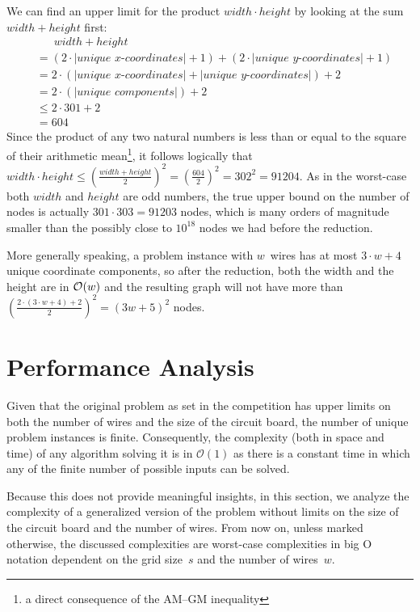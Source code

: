 \documentclass[sigconf,nonacm,screen]{acmart}
\begin{document}
We can find an upper limit for the product $width \cdot height$ by looking at the sum $width + height$ first:
\begin{align*}
    &\phantom{=~} width + height\\
    &=(2\cdot|\textit{unique x-coordinates}|+1)+(2\cdot|\textit{unique y-coordinates}|+1)\\
    &= 2\cdot(|\textit{unique x-coordinates}|+|\textit{unique y-coordinates}|)+2\\
    &= 2\cdot(|\textit{unique components}|)+2\\
    &\leq 2\cdot301+2\\
    &= 604
\end{align*}
Since the product of any two natural numbers is less than or equal to the square of their arithmetic mean\footnote{a direct consequence of the AM--GM inequality}, it follows logically that $width \cdot height \leq {\left(\frac{width + height}{2}\right)}^2 = {\left(\frac{604}{2}\right)}^2 = 302^2 = 91204$. As in the worst-case both $width$ and $height$ are odd numbers, the true upper bound on the number of nodes is actually $301 \cdot 303 = 91203$ nodes, which is many orders of magnitude smaller than the possibly close to $10^{18}$ nodes we had before the reduction.

More generally speaking, a problem instance with $w$~wires has at most $3\cdot w + 4$ unique coordinate components, so after the reduction, both the width and the height are in $\mathcal{O}\hspace{-0.15em}\left(w\right)$ and the resulting graph will not have more than ${\left(\frac{2\cdot(3\cdot w+4)+2}{2}\right)}^2 = (3w+5)^2$ nodes.

\section{Performance Analysis} \label{section:performance_analysis}
Given that the original problem as set in the competition has upper limits on both the number of wires and the size of the circuit board, the number of unique problem instances is finite.
Consequently, the complexity (both in space and time) of any algorithm solving it is in $\mathcal{O}(1)$
as there is a constant time in which any of the finite number of possible inputs can be solved.

Because this does not provide meaningful insights, in this section, we analyze the complexity of a generalized version of the problem without limits on the size of the circuit board and the number of wires. From now on, unless marked otherwise, the discussed complexities are worst-case complexities in big O notation dependent on the grid size~$s$ and the number of wires~$w$.
\end{document}
